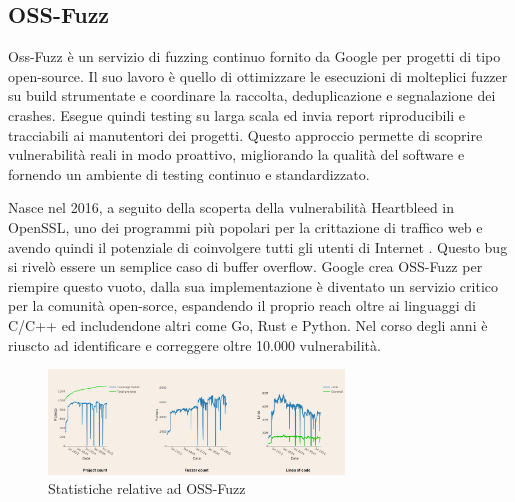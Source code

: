 \subsection{OSS-Fuzz}

Oss-Fuzz è un servizio di fuzzing continuo fornito da Google per progetti di tipo open-source. Il suo lavoro è quello di ottimizzare le esecuzioni di molteplici fuzzer su build strumentate e coordinare la raccolta, deduplicazione e segnalazione dei crashes. Esegue quindi testing su larga scala ed invia report riproducibili e tracciabili ai manutentori dei progetti. Questo approccio permette di scoprire vulnerabilità reali in modo proattivo, migliorando la qualità del software e fornendo un ambiente di testing continuo e standardizzato. 

Nasce nel 2016, a seguito della scoperta della vulnerabilità Heartbleed in OpenSSL, uno dei programmi più popolari per la crittazione di traffico web e avendo quindi il potenziale di coinvolgere tutti gli utenti di Internet \cite{ref30} \cite{ref34}. Questo bug si rivelò essere un semplice caso di buffer overflow. Google crea OSS-Fuzz per riempire questo vuoto, dalla sua implementazione è diventato un servizio critico per la comunità open-sorce, espandendo il proprio reach oltre ai linguaggi di C/C++ ed includendone altri come Go, Rust e Python. Nel corso degli anni è riuscto ad identificare e correggere oltre 10.000 vulnerabilità.

\begin{figure}[htbp]        
  \centering               
  \includegraphics[width=0.7\textwidth]{immagini/oss-fuzz_stats.jpg}  
  \caption{Statistiche relative ad OSS-Fuzz \cite{ref31}}  
  \label{fig:oss-fuzz_stats}      
\end{figure}

